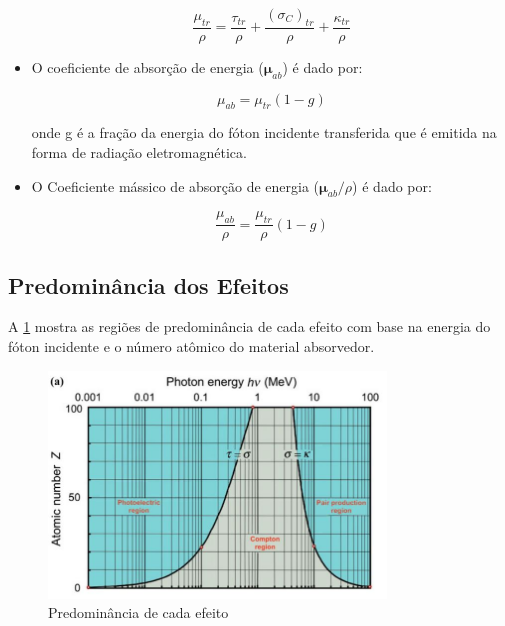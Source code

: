 \documentclass[11pt,a4paper]{article}
\begin{document}
\begin{itemize}
		\begin{equation}
			\frac{\mu_{tr}}{\rho} = \frac{\tau_{tr}}{\rho} + \frac{(\sigma_C)_{tr}}{\rho} + \frac{\kappa_{tr}}{\rho}
		\end{equation}

	
	\item O coeficiente de absorção de energia ($\mathbf{\mu}_{ab}$) é dado por:
	
		\begin{equation}
			\mu_{ab} = \mu_{tr}(1 - g)
		\end{equation}

	\noindent onde g é a fração da energia do fóton incidente transferida que é emitida na forma de radiação eletromagnética. 

	\item O Coeficiente mássico de absorção de energia ($\mathbf{\mu}_{ab}/\rho$) é dado por:
	
		\begin{equation}
			\frac{\mu_{ab}}{\rho} = \frac{\mu_{tr}}{\rho}(1 - g)
		\end{equation}

	\end{itemize}

\subsection*{Predominância dos Efeitos}

    A \ref{fig:predominanciaInteracoes} mostra as regiões de predominância de cada efeito com base na energia do fóton incidente e o número atômico do material absorvedor.    

            \begin{figure}[h]
                \centering
                \includegraphics[width=0.8\textwidth]{Imagens/predominanciaInteracoes.JPG}
                \caption{Predominância de cada efeito}
                \label{fig:predominanciaInteracoes}
            \end{figure}
\end{document}
